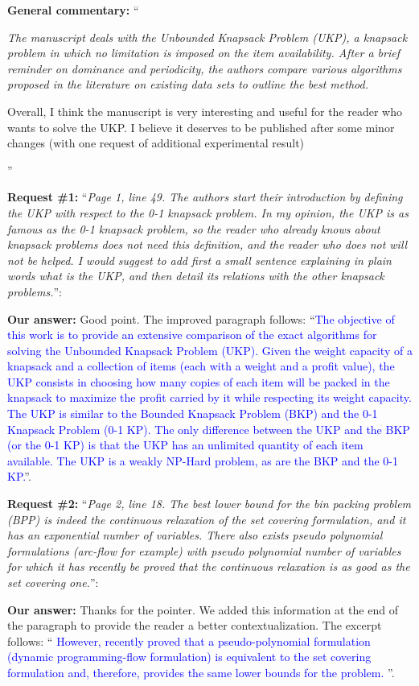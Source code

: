 \documentclass{elsarticle}
\begin{document}
\textbf{General commentary:} ``{\itshape
The manuscript deals with the Unbounded Knapsack Problem (UKP), a knapsack problem in which no limitation is imposed on the item availability. After a brief reminder on dominance and periodicity, the authors compare various algorithms proposed in the literature on existing data sets to outline the best method.

Overall, I think the manuscript is very interesting and useful for the reader who wants to solve the UKP. I believe it deserves to be published after some minor changes (with one request of additional experimental result)
}''

\bigskip

\textbf{Request \#1:} ``\textit{Page 1, line 49. The authors start their introduction by defining the UKP with respect to the 0-1 knapsack problem. In my opinion, the UKP is as famous as the 0-1 knapsack problem, so the reader who already knows about knapsack problems does not need this definition, and the reader who does not will not be helped. I would suggest to add first a small sentence explaining in plain words what is the UKP, and then detail its relations with the other knapsack problems.}'':

\textbf{Our answer:} Good point. The improved paragraph follows: ``\textcolor{blue}{The objective of this work is to provide an extensive comparison of the exact algorithms for solving the Unbounded Knapsack Problem (UKP). Given the weight capacity of a knapsack and a collection of items (each with a weight and a profit value), the UKP consists in choosing how many copies of each item will be packed in the knapsack to maximize the profit carried by it while respecting its weight capacity. The UKP is similar to the Bounded Knapsack Problem (BKP) and the 0-1 Knapsack Problem (0-1 KP). The only difference between the UKP and the BKP (or the 0-1 KP) is that the UKP has an unlimited quantity of each item available. The UKP is a weakly NP-Hard problem, as are the BKP and the 0-1 KP.}''.
\bigskip

\textbf{Request \#2:} ``\textit{Page 2, line 18. The best lower bound for the bin packing problem (BPP) is indeed the continuous relaxation of the set covering formulation, and it has an exponential number of variables. There also exists pseudo polynomial formulations (arc-flow for example) with pseudo polynomial number of variables for which it has recently be proved that the continuous relaxation is as good as the set covering one.}'':

\textbf{Our answer:} Thanks for the pointer. We added this information at the end of the paragraph to provide the reader a better contextualization. The excerpt follows: ``\textcolor{blue}{
However, recently \cite{eq_lb_delorme} proved that a pseudo-polynomial formulation (dynamic programming-flow formulation) is equivalent to the set covering formulation and, therefore, provides the same lower bounds for the problem.
}''.
\bigskip
\end{document}
